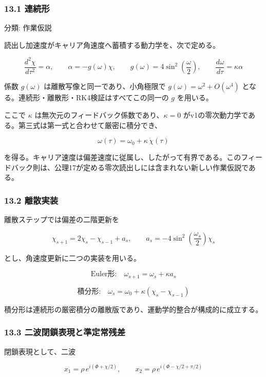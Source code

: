 \documentclass[
  a4paper,
]{ltjsarticle}
\begin{document}
\subsubsection{13.1 連続形}\label{ux9023ux7d9aux5f62}

分類: 作業仮説

読出し加速度がキャリア角速度へ蓄積する動力学を、次で定める。

\[
\frac{d^2\chi}{d\tau^2}=\alpha,
\qquad
\alpha=-g(\omega)\chi,
\qquad
g(\omega)=4\sin^2\!\left(\frac{\omega}{2}\right),
\qquad
\frac{d\omega}{d\tau}=\kappa\alpha
\]

係数 \(g(\omega)\) は離散写像と同一であり、小角極限で
\(g(\omega)=\omega^2+O(\omega^4)\)
となる。連続形・離散形・RK4検証はすべてこの同一の \(g\) を用いる。

ここで \(\kappa\) は無次元のフィードバック係数であり、\(\kappa=0\)
がv1の零次動力学である。第三式は第一式と合わせて厳密に積分でき、

\[
\boxed{
\omega(\tau)=\omega_0+\kappa\,\dot\chi(\tau)
}
\]

を得る。キャリア速度は偏差速度に従属し、したがって有界である。このフィードバック則は、公理17が定める零次読出しには含まれない新しい作業仮説である。

\subsubsection{13.2 離散実装}\label{ux96e2ux6563ux5b9fux88c5}

離散ステップでは偏差の二階更新を

\[
\chi_{s+1}=2\chi_s-\chi_{s-1}+a_s,
\qquad
a_s=-4\sin^2\!\left(\frac{\omega_s}{2}\right)\chi_s
\]

とし、角速度更新に二つの実装を用いる。

\[
\text{Euler形:}\quad
\omega_{s+1}=\omega_s+\kappa a_s
\]

\[
\text{積分形:}\quad
\omega_s=\omega_0+\kappa(\chi_s-\chi_{s-1})
\]

積分形は連続形の厳密積分の離散版であり、運動学的整合が構成的に成立する。

\subsubsection{13.3
二波閉鎖表現と準定常残差}\label{ux4e8cux6ce2ux9589ux9396ux8868ux73feux3068ux6e96ux5b9aux5e38ux6b8bux5dee}

閉鎖表現として、二波

\[
x_1=\rho\,e^{i(\Phi+\chi/2)},
\qquad
x_2=\rho\,e^{i(\Phi-\chi/2+\pi/2)}
\]
\end{document}
